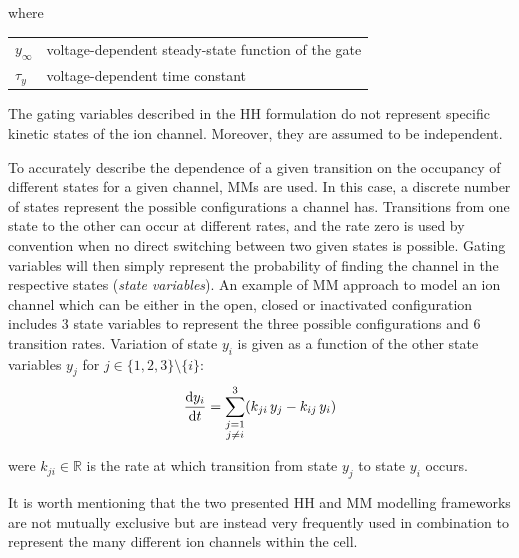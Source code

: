 \noindent
where

\vspace{0.5cm}
\begin{tabular}{ll}
$y_{\infty}$ & voltage-dependent steady-state function of the gate \\
$\tau_{y}$ & voltage-dependent time constant
\end{tabular}

\vspace{0.5cm}
\noindent
The gating variables described in the HH formulation do not represent specific kinetic states of the ion channel. Moreover, they are assumed to be independent.

\vspace{0.2cm}
To accurately describe the dependence of a given transition on the occupancy of different states for a given channel, MMs are used. In this case, a discrete number of states represent the possible configurations a channel has. Transitions from one state to the other can occur at different rates, and the rate zero is used by convention when no direct switching between two given states is possible. Gating variables will then simply represent the probability of finding the channel in the respective states (\textit{state variables}). An example of MM approach to model an ion channel which can be either in the open, closed or inactivated configuration includes $3$ state variables to represent the three possible configurations and $6$ transition rates. Variation of state $y_i$ is given as a function of the other state variables $y_j$ for $j\in\{1,2,3\}\setminus{\{i\}}$:
%
\begin{equation}
    \dfrac{\mathrm{d}{y_i}}{\mathrm{d}{t}} = \sum_{\substack{j=1 \\ j\neq i}}^{3} (k_{ji}\,y_j-k_{ij}\,y_i)
\end{equation}

\noindent
were $k_{ji}\in\mathbb{R}$ is the rate at which transition from state $y_j$ to state $y_i$ occurs.

\vspace{0.5cm}
It is worth mentioning that the two presented HH and MM modelling frameworks are not mutually exclusive but are instead very frequently used in combination to represent the many different ion channels within the cell.



